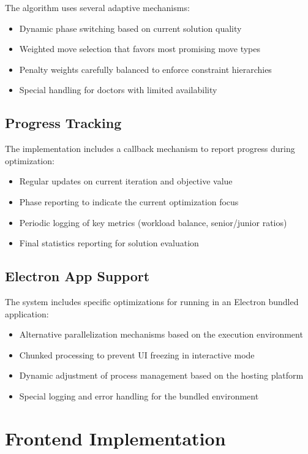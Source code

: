 \documentclass[12pt]{article}
\begin{document}
The algorithm uses several adaptive mechanisms:
\begin{itemize}
    \item Dynamic phase switching based on current solution quality
    \item Weighted move selection that favors most promising move types
    \item Penalty weights carefully balanced to enforce constraint hierarchies
    \item Special handling for doctors with limited availability
\end{itemize}

\subsection{Progress Tracking}

The implementation includes a callback mechanism to report progress during optimization:
\begin{itemize}
    \item Regular updates on current iteration and objective value
    \item Phase reporting to indicate the current optimization focus
    \item Periodic logging of key metrics (workload balance, senior/junior ratios)
    \item Final statistics reporting for solution evaluation
\end{itemize}

\subsection{Electron App Support}

The system includes specific optimizations for running in an Electron bundled application:
\begin{itemize}
    \item Alternative parallelization mechanisms based on the execution environment
    \item Chunked processing to prevent UI freezing in interactive mode
    \item Dynamic adjustment of process management based on the hosting platform
    \item Special logging and error handling for the bundled environment
\end{itemize}

\section{Frontend Implementation}
\end{document}
